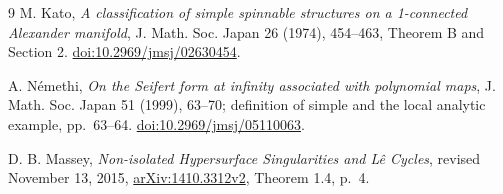 \documentclass[11pt]{article}
\begin{document}
\begin{thebibliography}{9}
M. Kato, \emph{A classification of simple spinnable structures on a
1-connected Alexander manifold}, J. Math. Soc. Japan 26 (1974),
454--463, Theorem B and Section 2.
\href{https://doi.org/10.2969/jmsj/02630454}
{doi:10.2969/jmsj/02630454}.

A. N\'emethi, \emph{On the Seifert form at infinity associated with
polynomial maps}, J. Math. Soc. Japan 51 (1999), 63--70;
definition of simple and the local analytic example, pp.~63--64.
\href{https://doi.org/10.2969/jmsj/05110063}
{doi:10.2969/jmsj/05110063}.

D. B. Massey, \emph{Non-isolated Hypersurface Singularities and
L\^e Cycles}, revised November 13, 2015,
\href{https://arxiv.org/abs/1410.3312v2}{arXiv:1410.3312v2},
Theorem 1.4, p.~4.
\end{thebibliography}
\end{document}
